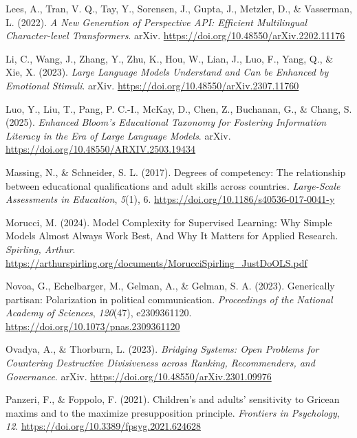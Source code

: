 \documentclass[
  12pt,
]{article}
\newlength{\cslhangindent}
\newenvironment{CSLReferences}[2] %
 {\begin{list}{}{%
  \setlength{\itemindent}{0pt}
  \setlength{\leftmargin}{0pt}
  \setlength{\parsep}{0pt}
  \ifodd #1
   \setlength{\leftmargin}{\cslhangindent}
   \setlength{\itemindent}{-1\cslhangindent}
  \fi
  \setlength{\itemsep}{#2\baselineskip}}}
 {\end{list}}
\begin{document}
\begin{CSLReferences}{1}{0}
Lees, A., Tran, V. Q., Tay, Y., Sorensen, J., Gupta, J., Metzler, D., \& Vasserman, L. (2022). \emph{A {New} {Generation} of {Perspective} {API}: {Efficient} {Multilingual} {Character}-level {Transformers}}. arXiv. \url{https://doi.org/10.48550/arXiv.2202.11176}

Li, C., Wang, J., Zhang, Y., Zhu, K., Hou, W., Lian, J., Luo, F., Yang, Q., \& Xie, X. (2023). \emph{Large {Language} {Models} {Understand} and {Can} be {Enhanced} by {Emotional} {Stimuli}}. arXiv. \url{https://doi.org/10.48550/arXiv.2307.11760}

Luo, Y., Liu, T., Pang, P. C.-I., McKay, D., Chen, Z., Buchanan, G., \& Chang, S. (2025). \emph{Enhanced {Bloom}'s {Educational} {Taxonomy} for {Fostering} {Information} {Literacy} in the {Era} of {Large} {Language} {Models}}. arXiv. \url{https://doi.org/10.48550/ARXIV.2503.19434}

Massing, N., \& Schneider, S. L. (2017). Degrees of competency: The relationship between educational qualifications and adult skills across countries. \emph{Large-Scale Assessments in Education}, \emph{5}(1), 6. \url{https://doi.org/10.1186/s40536-017-0041-y}

Morucci, M. (2024). Model {Complexity} for {Supervised} {Learning}: {Why} {Simple} {Models} {Almost} {Always} {Work} {Best}, {And} {Why} {It} {Matters} for {Applied} {Research}. \emph{Spirling, Arthur}. \url{https://arthurspirling.org/documents/MorucciSpirling_JustDoOLS.pdf}

Novoa, G., Echelbarger, M., Gelman, A., \& Gelman, S. A. (2023). Generically partisan: {Polarization} in political communication. \emph{Proceedings of the National Academy of Sciences}, \emph{120}(47), e2309361120. \url{https://doi.org/10.1073/pnas.2309361120}

Ovadya, A., \& Thorburn, L. (2023). \emph{Bridging {Systems}: {Open} {Problems} for {Countering} {Destructive} {Divisiveness} across {Ranking}, {Recommenders}, and {Governance}}. arXiv. \url{https://doi.org/10.48550/arXiv.2301.09976}

Panzeri, F., \& Foppolo, F. (2021). Children's and adults' sensitivity to {Gricean} maxims and to the maximize presupposition principle. \emph{Frontiers in Psychology}, \emph{12}. \url{https://doi.org/10.3389/fpsyg.2021.624628}


\end{CSLReferences}
\end{document}
